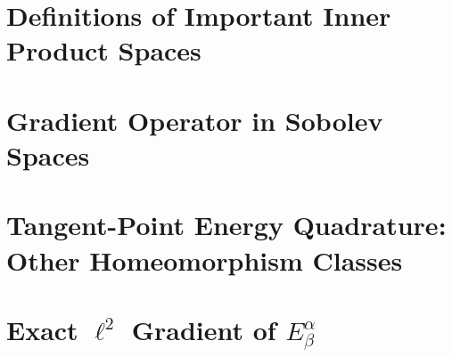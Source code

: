 \documentclass[a4paper, 12pt]{article}
\numberwithin{equation}{section}
\numberwithin{figure}{section}
\theoremstyle{definition}
\theoremstyle{plain}
\theoremstyle{plain}
\theoremstyle{plain}
\theoremstyle{remark}
\numberwithin{theorem}{section}
\begin{document}
\newpage
%
\begin{appendices}
    \section{Definitions of Important Inner Product Spaces}
    \label{sct: Definitions of Important Inner Product Spaces}
    
    \section{Gradient Operator in Sobolev Spaces}
    \label{sct: Integration By Parts}
    
    \section{Tangent-Point Energy Quadrature: Other Homeomorphism Classes}
    
    \section{Exact $\ell^2$ Gradient of $E_{\beta}^{\alpha}$}
    \label{sct: Exact Gradient}
    
\end{appendices}

\printbibliography
\end{document}
